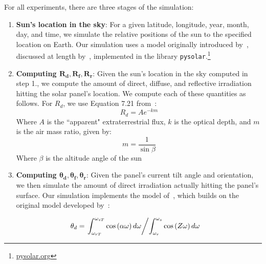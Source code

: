 \documentclass[11pt]{article}
\begin{document}
For all experiments, there are three stages of the simulation:
\begin{enumerate}
\item {\bf Sun's location in the sky}: For a given latitude, longitude, year, month, day, and time, we simulate the relative positions of the sun to the specified location on Earth. Our simulation uses a model originally introduced by~\citet{jordan1958chafer}, discussed at length by~\citet{masters2013renewable}, implemented in the library \texttt{pysolar}.\footnote{\url{pysolar.org}}

\item {\bf Computing $\pmb{R_d, R_f, R_r}$}: Given the sun's location in the sky computed in step 1., we compute the amount of direct, diffuse, and reflective irradiation hitting the solar panel's location. We compute each of these quantities as follows. For $R_d$, we use Equation 7.21 from~\citet{masters2013renewable}:
\begin{equation}
R_d = A e^{-km}
\end{equation}
Where $A$ is the ``apparent" extraterrestrial flux, $k$ is the optical depth, and $m$ is the air mass ratio, given by:
\begin{equation}
m = \frac{1}{\sin \beta}
\end{equation}
Where $\beta$ is the altitude angle of the sun

\item {\bf Computing $\pmb{\theta_d, \theta_f, \theta_r}$}: Given the panel's current tilt angle and orientation, we then simulate the amount of direct irradiation actually hitting the panel's surface. Our simulation implements the model of~\citet{andersen1980comments}, which builds on the original model developed by~\citet{klein1977calculation}:

\begin{align*}
\theta_d &= \left. \int_{\omega_{rT}}^{\omega_{sT}} \cos \left(\alpha \omega\right) d \omega \middle/ \int_{\omega_{r}}^{\omega_{s}} \cos \left(Z \omega\right) d \omega \right.
\end{align*}


\end{enumerate}
\end{document}
